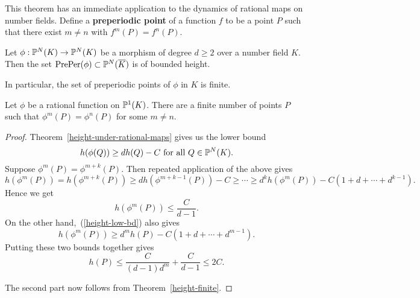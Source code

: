 This theorem has an immediate application to the dynamics of rational maps on number fields. Define a \textbf{preperiodic point} of a function $f$ to be a point $P$ such that there exist $m\ne n$ with $f^m(P)=f^n(P)$.
\begin{thm}[Northcott]
Let $\phi:\mathbb{P}^N(K)\to \mathbb{P}^N(K)$ be a morphism of degree $d\ge 2$ over a number field $K$. Then the set $\operatorname{PrePer}(\phi)\subset \mathbb{P}^N(\overline{K})$ is of bounded height. 

In particular, the set of preperiodic points of $\phi$ in $K$ is finite.
\end{thm}
\begin{cor}
Let $\phi$ be a rational function on $\mathbb{P}^1(K)$. There are a finite number of points $P$ such that $\phi^m(P)=\phi^n(P)$ for some $m\ne n$.
\end{cor}
\begin{proof}
Theorem~\ref{height-under-rational-maps} gives us the lower bound
\begin{equation}\label{height-low-bd}
h(\phi(Q))\ge dh(Q)-C\text{ for all }Q\in \mathbb{P}^N(K).
\end{equation}
Suppose $\phi^m(P)=\phi^{m+k}(P)$. Then repeated application of the above gives
\[
h(\phi^m(P))=h(\phi^{m+k}(P))\ge dh(\phi^{m+k-1}(P))-C\ge\cdots \ge d^kh(\phi^m(P))-C(1+d+\cdots +d^{k-1}).
\]
Hence we get
\[
h(\phi^m(P))\le \frac{C}{d-1}.
\]
On the other hand,~(\ref{height-low-bd}) also gives
\[
h(\phi^m(P))\ge d^mh(P)-C(1+d+\cdots +d^{m-1}).
\]
Putting these two bounds together gives
\[
h(P)\le \frac{C}{(d-1)d^m}+\frac{C}{d-1}\le 2C.
\]

The second part now follows from Theorem~\ref{height-finite}.
\end{proof}